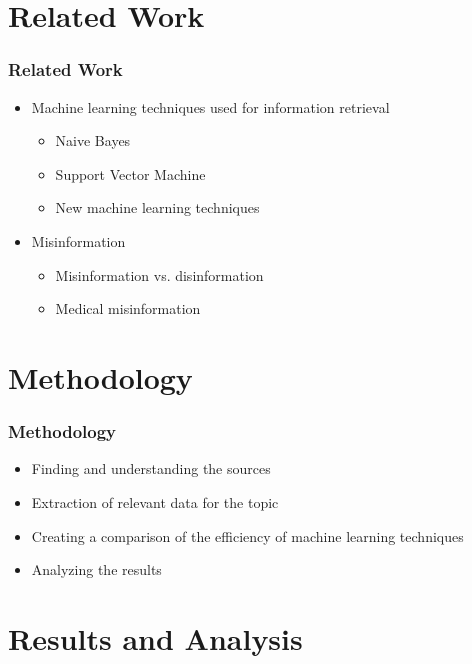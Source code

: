 \documentclass{beamer}
\begin{document}
\section{Related Work}

\begin{frame}[fragile=singleslide]\frametitle{Related Work}
\begin{itemize}[label=$\bullet$]
\item Machine learning techniques used for information retrieval
	\begin{itemize}[label=$\bullet$]
	\item Naive Bayes
	\item Support Vector Machine
	\item New machine learning techniques
	\end{itemize}
\item Misinformation
	\begin{itemize}[label=$\bullet$]
	\item Misinformation vs. disinformation
	\item Medical misinformation
	\end{itemize}
\end{itemize}
\end{frame}



\section{Methodology}

\begin{frame}[fragile=singleslide]\frametitle{Methodology}
\begin{itemize}[label=$\bullet$]
\item Finding and understanding the sources
\item Extraction of relevant data for the topic
\item Creating a comparison of the efficiency of machine learning techniques
\item Analyzing the results
\end{itemize}
\end{frame}

\section{Results and Analysis}
\end{document}

